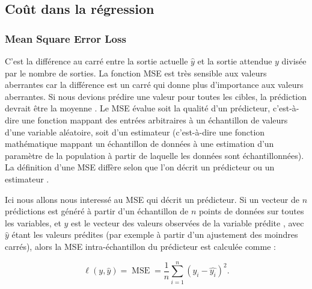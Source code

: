 	
		
	
	\subsection{Coût dans la régression}
		\subsubsection{Mean Square Error Loss}
		
		 C'est la différence au carré entre la sortie actuelle $\hat{y}$ et la sortie attendue $y$ divisée par le nombre de sorties. La fonction MSE est très sensible aux valeurs aberrantes car la différence est un carré qui donne plus d'importance aux valeurs aberrantes. Si nous devions prédire une valeur pour toutes les cibles, la prédiction devrait être la moyenne \cite{bishop2006pattern, goodfellow2016deep}.
		 Le MSE évalue soit la qualité d'un prédicteur, c'est-à-dire une fonction mappant des entrées arbitraires à un échantillon de valeurs d'une variable aléatoire, soit d'un estimateur (c'est-à-dire une fonction mathématique mappant un échantillon de données à une estimation d'un paramètre de la population à partir de laquelle les données sont échantillonnées). La définition d'une MSE diffère selon que l'on décrit un prédicteur ou un estimateur \cite{sarkar2017practical, burges2006learning}.
		 
		 Ici nous allons nous interessé au MSE qui décrit un prédicteur. Si un vecteur de ${\displaystyle n}$ prédictions est généré à partir d'un échantillon de ${\displaystyle n}$ points de données sur toutes les variables, et ${\displaystyle y}$ est le vecteur des valeurs observées de la variable prédite , avec ${\displaystyle {\hat {y}}}$ étant les valeurs prédites (par exemple à partir d'un ajustement des moindres carrés), alors la MSE intra-échantillon du prédicteur est calculée comme :
		 
	
		 \begin{equation}
		 	{\displaystyle \ell(y,\hat{y}) = \operatorname {MSE} ={\frac {1}{n}}\sum_{i=1}^{n}(y_{i}-{\hat {y_{i}}})^{2}.}
		 \end{equation}
		 
	
	
	
	

